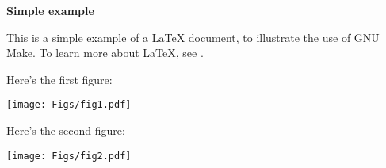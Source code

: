 \documentclass[12pt]{article}
\begin{document}
\textbf{Simple example}

\bigskip

This is a simple example of a \LaTeX\/ document, to illustrate the use
of GNU Make. To learn more about \LaTeX, see \cite{Kopka2003}.

Here's the first figure:

\centerline{\texttt{[image: Figs/fig1.pdf]}}

Here's the second figure:

\centerline{\texttt{[image: Figs/fig2.pdf]}}

{}

\end{document}
